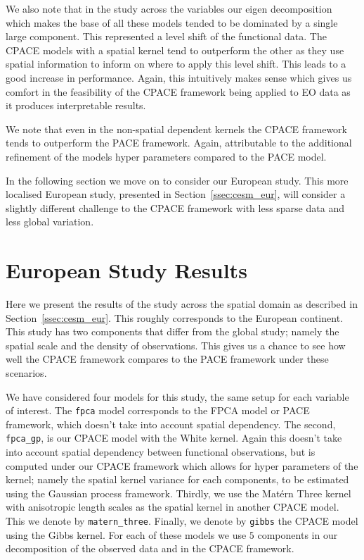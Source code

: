 We also note that in the study across the variables our eigen decomposition which makes the base of all these models tended to be dominated by a single large component.
This represented a level shift of the functional data.
The CPACE models with a spatial kernel tend to outperform the other as they use spatial information to inform on where to apply this level shift.
This leads to a good increase in performance.
Again, this intuitively makes sense which gives us comfort in the feasibility of the CPACE framework being applied to EO data as it produces interpretable results.

We note that even in the non-spatial dependent kernels the CPACE framework tends to outperform the PACE framework.
Again, attributable to the additional refinement of the models hyper parameters compared to the PACE model.

In the following section we move on to consider our European study. 
This more localised European study, presented in Section~\ref{ssec:cesm_eur}, will consider a slightly different challenge to the CPACE framework with less sparse data and less global variation.

\section{European Study Results \label{sec:cesm_res_eurr}}
Here we present the results of the study across the spatial domain as described in Section~\ref{ssec:cesm_eur}.
This roughly corresponds to the European continent.
This study has two components that differ from the global study; namely the spatial scale and the density of observations.
This gives us a chance to see how well the CPACE framework compares to the PACE framework under these scenarios.

We have considered four models for this study, the same setup for each variable of interest.
The \verb*|fpca| model corresponds to the FPCA model or PACE framework, which doesn't take into account spatial dependency.
The second, \verb*|fpca_gp|, is our CPACE model with the White kernel.
Again this doesn't take into account spatial dependency between functional observations, but is computed under our CPACE framework which allows for hyper parameters of the kernel; namely the spatial kernel variance for each components, to be estimated using the Gaussian process framework.
Thirdly, we use the Mat\'ern Three kernel with anisotropic length scales as the spatial kernel in another CPACE model.
This we denote by \verb*|matern_three|.
Finally, we denote by \verb*|gibbs| the CPACE model using the Gibbs kernel.
For each of these models we use $5$ components in our decomposition of the observed data and in the CPACE framework. 

